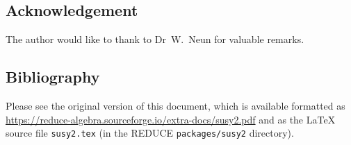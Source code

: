\subsection*{Acknowledgement}

The author would like to thank to Dr~W.~Neun for valuable remarks.

\hypertarget{susy2-bib}{\subsection*{Bibliography}}

Please see the original version of this document, which is available
formatted as
\url{https://reduce-algebra.sourceforge.io/extra-docs/susy2.pdf} and
as the \LaTeX{} source file \texttt{susy2.tex} (in the REDUCE
\texttt{packages/susy2} directory).
